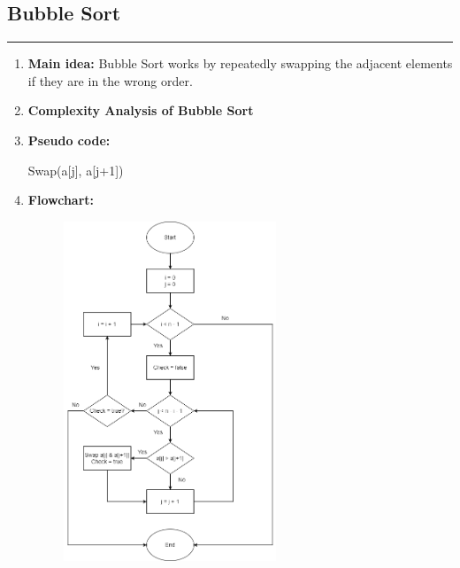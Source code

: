 \documentclass[11pt,a4paper]{article}
\begin{document}
{		\subsection{Bubble Sort}
		\rule{15cm}{0.1cm}
			\begin{enumerate}[label=\textbf{\arabic*})]
				\item \textbf{Main idea:}
				Bubble Sort works by repeatedly swapping the adjacent elements if they are in the wrong order.
				\\[12pt]
				\item \textbf{Complexity Analysis of Bubble Sort}
				\\[12pt]
				\item \textbf{Pseudo code:} 
			    \begin{algorithm}
            	\begin{algorithmic}[1]
            						\State Swap(a[j], a[j+1])
            					\EndIf
            				\EndFor
            			\EndFor
            		\EndProcedure
            	\end{algorithmic}
                \end{algorithm}
				\item \textbf{Flowchart:}
					\begin{figure}[H]
						\centering 
						\includegraphics[width=0.6\textwidth]{BubbleSortFlowchart}
					\end{figure}
					

\end{enumerate}}
\end{document}
